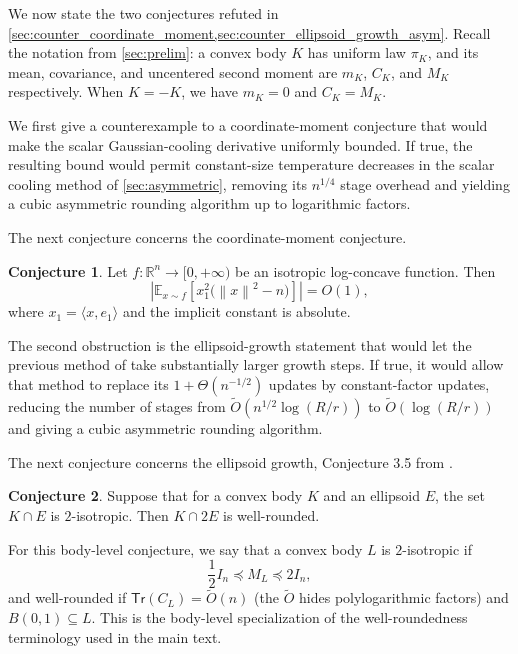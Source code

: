 \documentclass[11pt]{article}
\numberwithin{equation}{section}
\theoremstyle{definition}
\newtheorem{conjecture}[conjecture]{Conjecture}
\newcommand{\R}{\mathbb{R}}
\newcommand{\E}[2]{\mathbb{E}_{#1}\left[#2\right]}
\newcommand{\Tr}[1]{\mathsf{Tr}\left(#1\right)}
\newcommand{\norm}[1]{\left\lVert#1\right\rVert}
\begin{document}
We now state the two conjectures refuted in \cref{sec:counter_coordinate_moment,sec:counter_ellipsoid_growth_asym}.
Recall the notation from \cref{sec:prelim}: a convex body $K$ has
uniform law $\pi_K$, and its mean, covariance, and uncentered second
moment are $m_K$,
$C_K$, and
$M_K$ respectively.
When $K=-K$, we have
$m_K=0$ and
$C_K=M_K$.

We first give a counterexample to a coordinate-moment conjecture that would
make the scalar Gaussian-cooling derivative uniformly bounded.
If true, the resulting bound would permit constant-size temperature decreases in
the scalar cooling method of \cref{sec:asymmetric}, removing its $n^{1/4}$ stage
overhead and yielding a cubic asymmetric rounding algorithm up to logarithmic
factors.

The next conjecture concerns the coordinate-moment conjecture.

\begin{conjecture}\label{conj:first}
\label{conj:gaussian-cooling-coordinate-moment}
Let $f:\R^n\to[0,+\infty)$ be an isotropic log-concave function.
Then
\[
  \left|\E{x\sim f}{x_1^2\bigl(\norm{x}^2-n\bigr)}\right|=O(1),
\]
where $x_1=\langle x,e_1\rangle$ and the implicit constant is absolute.
\end{conjecture}

The second obstruction is the ellipsoid-growth statement that would let the
previous method of \cite{JLLV26:journal} take substantially larger growth steps.
If true, it would allow that method to replace its $1+\Theta(n^{-1/2})$ updates
by constant-factor updates, reducing the number of stages from
$\widetilde O(n^{1/2}\log(R/r))$ to
$\widetilde O(\log(R/r))$ and giving a cubic asymmetric rounding algorithm.

The next conjecture concerns the ellipsoid growth, Conjecture 3.5 from
\cite{JLLV26:journal}.

\begin{conjecture}
\label{conj:jllv-ellipsoid-growth}
Suppose that for a convex body $K$ and an ellipsoid
$E$, the set
$K\cap E$ is
$2$-isotropic.
Then $K\cap 2E$ is well-rounded.
\end{conjecture}

For this body-level conjecture, we say that a convex body $L$ is
$2$-isotropic if
\[
\frac12 I_n
\preceq M_L
\preceq 2I_n,
\]
and well-rounded if $\Tr{C_L}=\widetilde O(n)$ (the
$\widetilde O$ hides polylogarithmic factors) and
$B(0,1)\subseteq L$.
This is the body-level specialization of the well-roundedness terminology used
in the main text.
\end{document}
